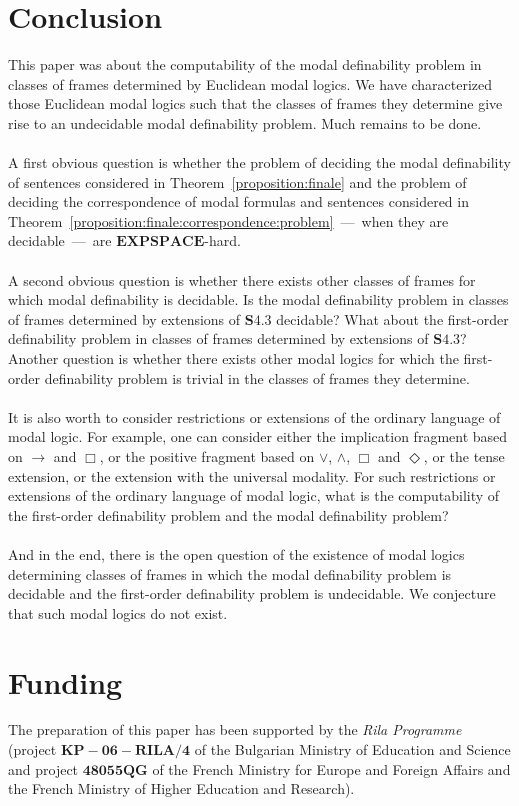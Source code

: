 \documentclass[draft]{article}
\def\EXPSPACE{\mathbf{EXPSPACE}}
\def\S{\mathbf{S}}
\begin{document}
\section{Conclusion}\label{section:conclusion}
%
%
This paper was about the computability of the modal definability problem in classes of frames determined by Euclidean modal logics.
We have characterized those Euclidean modal logics such that the classes of frames they determine give rise to an undecidable modal definability problem.
Much remains to be done.
%
%
\\
\\
%
%
A first obvious question is whether the problem of deciding the modal definability of sentences considered in Theorem~\ref{proposition:finale} and the problem of deciding the correspondence of modal formulas and sentences considered in Theorem~\ref{proposition:finale:correspondence:problem}~---~when they are decidable~---~are $\EXPSPACE$-hard.
%
%
\\
\\
%
%
A second obvious question is whether there exists other classes of frames for which modal definability is decidable.
Is the modal definability problem in classes of frames determined by extensions of $\S4.3$ decidable?
What about the first-order definability problem in classes of frames determined by extensions of $\S4.3$?
Another question is whether there exists other modal logics for which the first-order definability problem is trivial in the classes of frames they determine.
%
%
\\
\\
%
%
It is also worth to consider restrictions or extensions of the ordinary language of modal logic.
For example, one can consider either the implication fragment based on $\rightarrow$ and $\Box$, or the positive fragment based on $\vee$, $\wedge$, $\Box$ and $\Diamond$, or the tense extension, or the extension with the universal modality.
For such restrictions or extensions of the ordinary language of modal logic, what is the computability of the first-order definability problem and the modal definability problem?
%
%
\\
\\
%
%
And in the end, there is the open question of the existence of modal logics determining classes of frames in which the modal definability problem is decidable and the first-order definability problem is undecidable.
We conjecture that such modal logics do not exist.
%
%
%
%
\section*{Funding}
%
%
The preparation of this paper has been supported by the {\it Rila Programme} (project $\mathbf{KP{-}06{-}RILA{/}4}$ of the Bulgarian Ministry of Education and Science and project $\mathbf{48055QG}$ of the French Ministry for Europe and Foreign Affairs and the French Ministry of Higher Education and Research).
%
%
%
%
\end{document}
